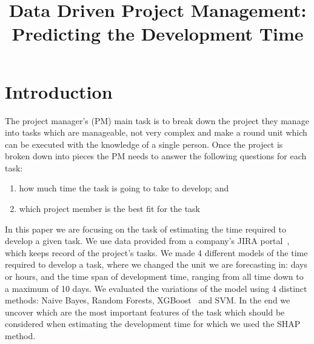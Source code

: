 \documentclass[conference,compsoc]{IEEEtran}
\begin{document}
\title{Data Driven Project Management: \\ Predicting the Development Time}


\author{
}

\maketitle

\begin{abstract}

\end{abstract}

\IEEEpeerreviewmaketitle

\section{Introduction}

The project manager's (PM) main task is to break down the project they manage into tasks which are manageable, not very complex and make a round unit which can be executed with the knowledge of a single person.
Once the project is broken down into pieces the PM needs to answer the following questions for each task:
\begin{enumerate}
	\item how much time the task is going to take to develop; and
	\item which project member is the best fit for the task
\end{enumerate}
In this paper we are focusing on the task of estimating the time required to develop a given task. We use data provided from a company's JIRA portal~\cite{JIRA}, which keeps record of the project's tasks. We made 4 different models of the time required to develop a task, where we changed the unit we are forecasting in: days or hours, and the time span of development time, ranging from all time down to a maximum of 10 days. We evaluated the variations of the model using 4 distinct methods: Naive Bayes, Random Forests, XGBoost~\cite{chen2016xgboost} and SVM. In the end we uncover which are the most important features of the task which should be considered when estimating the development time for which we used the SHAP~\cite{lundberg2020local2global} method.
\end{document}
